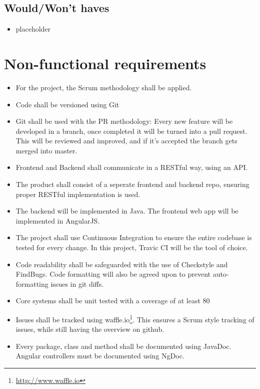 \section{Would/Won't haves}
\begin{itemize}
\item placeholder
\end{itemize}

\chapter{Non-functional requirements}
\begin{itemize}

\item For the project, the Scrum methodology shall be applied.

\item Code shall be versioned using Git

\item Git shall be used with the PR methodology: Every new feature will be developed in a branch, once completed it will be turned into a pull request. This will be reviewed and improved, and if it's accepted the branch gets merged into master.

\item Frontend and Backend shall communicate in a RESTful way, using an API.

\item The product shall consist of a seperate frontend and backend repo, ensuring proper RESTful implementation is used.

\item The backend will be implemented in Java. The frontend web app will be implemented in AngularJS. 

\item The project shall use Continuous Integration to ensure the entire codebase is tested for every change. In this project, Travic CI will be the tool of choice.

\item Code readability shall be safeguarded with the use of Checkstyle and FindBugs. Code formatting will also be agreed upon to prevent auto-formatting issues in git diffs.

\item Core systems shall be unit tested with a coverage of at least 80%

\item Issues shall be tracked using waffle.io\footnote{\url{http://www.waffle.io}}. This ensures a Scrum style tracking of issues, while still having the overview on github.

\item Every package, class and method shall be documented using JavaDoc. Angular controllers must be documented using NgDoc. 

\end{itemize}